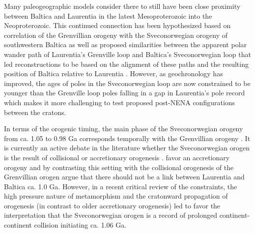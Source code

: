 \documentclass[twocolumn, switch]{article} %
\begin{document}
Many paleogeographic models consider there to still have been close proximity between Baltica and Laurentia in the latest Mesoproterozoic into the Neoproterozoic. This continued connection has been hypothesized based on correlation of the Grenvillian orogeny with the Sveconorwegian orogeny of southwestern Baltica\citep{Gower1990b} as well as proposed similarities between the apparent polar wander path of Laurentia's Grenville loop and Baltica's Sveconorwegian loop that led reconstructions to be based on the alignment of these paths and the resulting position of Baltica relative to Laurentia \citep{Piper1980a,Pisarevsky2003a}. However, as geochronology has improved, the ages of poles in the Sveconorwegian loop are now constrained to be younger than the Grenville loop poles falling in a gap in Laurentia's pole record \citep{Evans2015a,Fairchild2017a} which makes it more challenging to test proposed post-NENA configurations between the cratons.

In terms of the orogenic timing, the main phase of the Sveconorwegian orogeny from ca. 1.05 to 0.98 Ga corresponds temporally with the Grenvillian orogeny \citep{Stephens2020a}. It is currently an active debate in the literature whether the Sveconorwegian orogen is the result of collisional or accretionary orogenesis \citep{Stephens2020a}. \cite{Slagstad2019a} favor an accretionary orogeny and by contrasting this setting with the collisional orogenesis of the Grenvillian orogen argue that there should not be a link between Laurentia and Baltica ca. 1.0 Ga. However, in a recent critical review of the constraints, the high pressure nature of metamorphism and the cratonward propagation of orogenesis (in contrast to older accretionary orogenesis) led \cite{Stephens2020a} to favor the interpretation that the Sveconorwegian orogen is a record of prolonged continent-continent collision initiating ca. 1.06 Ga. 
\end{document}
